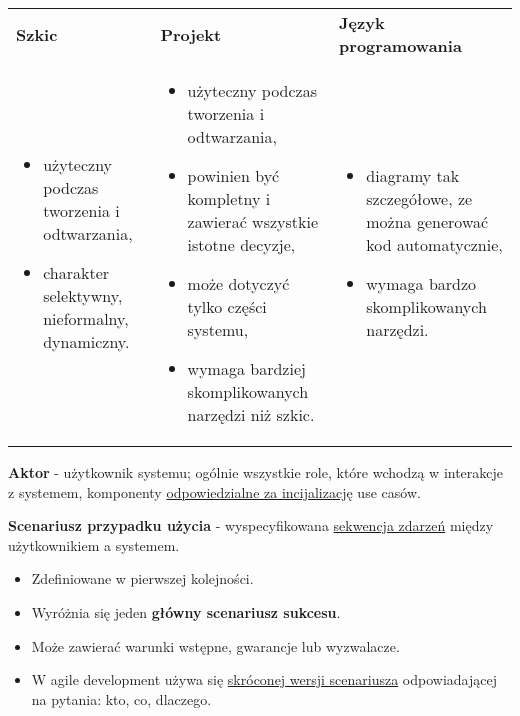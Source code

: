 \documentclass[a4paper]{article}
\begin{document}
    \begin{table}[H]
        \begin{center}
            \begin{tabular}{  p{5cm} p{5cm}  p{5cm} }
                \toprule
                \textbf{Szkic} & \textbf{Projekt} & \textbf{Język programowania}\\

                \cmidrule(r){1-1}\cmidrule(rl){2-2}\cmidrule(l){3-3}

                \begin{itemize}
                    \item użyteczny podczas tworzenia i odtwarzania,
                    \item charakter selektywny, nieformalny, dynamiczny.
                \end{itemize}
                &
                \begin{itemize}
                    \item użyteczny podczas tworzenia i odtwarzania,
                    \item powinien być kompletny i zawierać wszystkie istotne decyzje,
                    \item może dotyczyć tylko części systemu,
                    \item wymaga bardziej skomplikowanych narzędzi niż szkic.
                \end{itemize}
                &
                \begin{itemize}
                    \item diagramy tak szczegółowe, ze można generować kod automatycznie,
                    \item wymaga bardzo skomplikowanych narzędzi.
                \end{itemize}
                \\


                \bottomrule
            \end{tabular}
        \end{center}
    \end{table}


    \textbf{Aktor} - użytkownik systemu; ogólnie wszystkie role, które wchodzą w interakcje z systemem, komponenty \underline{odpowiedzialne
    za incijalizację} use casów.

    \textbf{Scenariusz przypadku użycia} - wyspecyfikowana \underline{sekwencja zdarzeń} między użytkownikiem a systemem.
    \begin{itemize}
        \item Zdefiniowane w pierwszej kolejności.
        \item Wyróżnia się jeden \textbf{główny scenariusz sukcesu}.
        \item Może zawierać warunki wstępne, gwarancje lub wyzwalacze.
        \item W agile development używa się \underline{skróconej wersji scenariusza} odpowiadającej
        na pytania: kto, co, dlaczego.
    \end{itemize}
\end{document}
